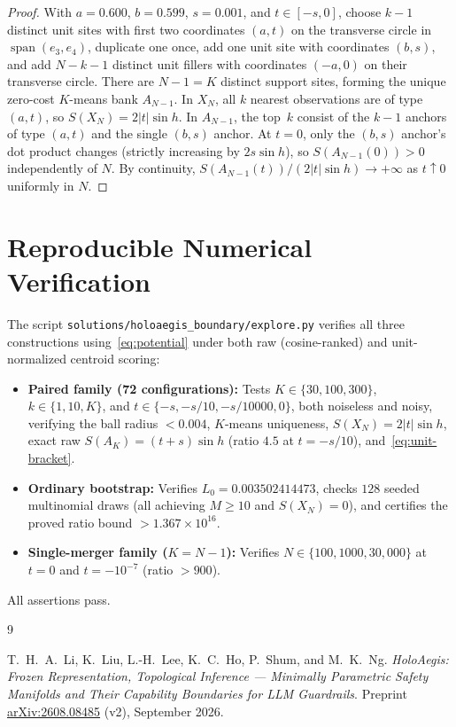 \documentclass[11pt]{article}
\theoremstyle{plain}
\theoremstyle{definition}
\theoremstyle{remark}
\begin{document}
\begin{proof}
With $a = 0.600$, $b = 0.599$, $s = 0.001$, and $t \in [-s, 0]$, choose $k - 1$ distinct unit sites with first two coordinates $(a, t)$ on the transverse circle in $\operatorname{span}(e_3, e_4)$, duplicate one once, add one unit site with coordinates $(b, s)$, and add $N - k - 1$ distinct unit fillers with coordinates $(-a, 0)$ on their transverse circle. There are $N - 1 = K$ distinct support sites, forming the unique zero-cost $K$-means bank $A_{N-1}$. In $X_N$, all $k$ nearest observations are of type $(a, t)$, so $S(X_N) = 2|t|\sin h$. In $A_{N-1}$, the top~$k$ consist of the $k - 1$ anchors of type $(a, t)$ and the single $(b, s)$ anchor. At $t = 0$, only the $(b, s)$ anchor's dot product changes (strictly increasing by $2s\sin h$), so $S(A_{N-1}(0)) > 0$ independently of $N$. By continuity, $S(A_{N-1}(t))/(2|t|\sin h) \to +\infty$ as $t \uparrow 0$ uniformly in $N$.
\end{proof}

\section{Reproducible Numerical Verification}

The script \texttt{solutions/holoaegis\_boundary/explore.py} verifies all three constructions using~\eqref{eq:potential} under both raw (cosine-ranked) and unit-normalized centroid scoring:
\begin{itemize}[leftmargin=*]
\item \textbf{Paired family (72 configurations):} Tests $K \in \{30, 100, 300\}$, $k \in \{1, 10, K\}$, and $t \in \{-s,\allowbreak -s/10,\allowbreak -s/10000,\allowbreak 0\}$, both noiseless and noisy, verifying the ball radius $< 0.004$, $K$-means uniqueness, $S(X_N) = 2|t|\sin h$, exact raw $S(A_K) = (t + s)\sin h$ (ratio $4.5$ at $t = -s/10$), and~\eqref{eq:unit-bracket}.
\item \textbf{Ordinary bootstrap:} Verifies $L_0 = 0.003502414473$, checks $128$ seeded multinomial draws (all achieving $M \ge 10$ and $S(X_N) = 0$), and certifies the proved ratio bound $> 1.367 \times 10^{16}$.
\item \textbf{Single-merger family ($K = N - 1$):} Verifies $N \in \{100, 1000, 30{,}000\}$ at $t = 0$ and $t = -10^{-7}$ (ratio $> 900$).
\end{itemize}
All assertions pass.

\begin{thebibliography}{9}

T.~H.~A.~Li, K.~Liu, L.-H.~Lee, K.~C.~Ho, P.~Shum, and M.~K.~Ng.
\emph{HoloAegis: Frozen Representation, Topological Inference --- Minimally Parametric Safety Manifolds and Their Capability Boundaries for LLM Guardrails}.
Preprint \href{https://arxiv.org/abs/2608.08485}{arXiv:2608.08485} (v2), September 2026.

\end{thebibliography}
\end{document}
